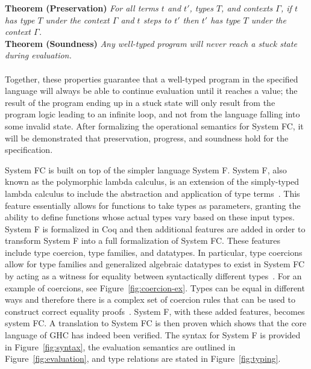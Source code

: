 \documentclass{sig-alternate}
\begin{document}
\noindent\textbf{Theorem (Preservation)} \textit{For all terms $t$ and $t'$, types $T$, and contexts $\Gamma$, if $t$ has type $T$ under the context $\Gamma$ and $t$ steps to $t'$ then $t'$ has type $T$ under the context $\Gamma$.} \\

\noindent\textbf{Theorem (Soundness)} \textit{Any well-typed program will never reach a stuck state during evaluation.}\\\\

Together, these properties guarantee that a well-typed program in the specified language will always be able to continue evaluation until it reaches a value; the result of the program ending up in a stuck state will only result from the program logic leading to an infinite loop, and not from the language falling into some invalid state. After formalizing the operational semantics for System FC, it will be demonstrated that preservation, progress, and soundness hold for the specification.

System FC is built on top of the simpler language System F. System F, also known as the polymorphic lambda calculus, is an extension of the simply-typed lambda calculus to include the abstraction and application of type terms~\cite{Pierce:TAPL}. This feature essentially allows for functions to take types as parameters, granting the ability to define functions whose actual types vary based on these input types. System F is formalized in Coq and then additional features are added in order to transform System F into a full formalization of System FC. These features include type coercion, type families, and datatypes. In particular, type coercions allow for type families and generalized algebraic datatypes to exist in System FC by acting as a witness for equality between syntactically different types~\cite{DBLP:conf/rta/VytiniotisJ13}. For an example of coercions, see Figure~\ref{fig:coercion-ex}. Types can be equal in different ways and therefore there is a complex set of coercion rules that can be used to construct correct equality proofs~\cite{Breitner:2014:SZC:2628136.2628141}. System F, with these added features, becomes system FC. A translation to System FC is then proven which shows that the core language of GHC has indeed been verified. The syntax for System F is provided in Figure~\ref{fig:syntax}, the evaluation semantics are outlined in Figure~\ref{fig:evaluation}, and type relations are stated in Figure~\ref{fig:typing}.
\newcommand\mybox[2][]{#2}%
\end{document}
